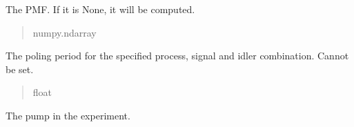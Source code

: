 \documentclass[a4paper,10pt,english]{sphinxmanual}
\begin{document}
\begin{fulllineitems}

\begin{fulllineitems}
\label{\detokenize{experiment:pyjsa.experiment.Experiment.pmf}}
\pysigstartsignatures
{}
\pysigstopsignatures
\sphinxAtStartPar
The PMF. If it is None, it will be computed.
\begin{quote}\begin{description}
\sphinxAtStartPar
numpy.ndarray

\end{description}\end{quote}

\end{fulllineitems}


\begin{fulllineitems}
\label{\detokenize{experiment:pyjsa.experiment.Experiment.poling_period}}
\pysigstartsignatures
{}
\pysigstopsignatures
\sphinxAtStartPar
The poling period for the specified process, signal and idler combination. Cannot be set.
\begin{quote}\begin{description}
\sphinxAtStartPar
float

\end{description}\end{quote}

\end{fulllineitems}


\begin{fulllineitems}
\label{\detokenize{experiment:pyjsa.experiment.Experiment.pump}}
\pysigstartsignatures
{}
\pysigstopsignatures
\sphinxAtStartPar
The pump in the experiment.
\begin{quote}\begin{description}
\sphinxAtStartPar
{\hyperref[\detokenize{pump:pyjsa.pump.Pump}]{}}


\end{description}
\end{quote}
\end{fulllineitems}
\end{fulllineitems}
\end{document}
